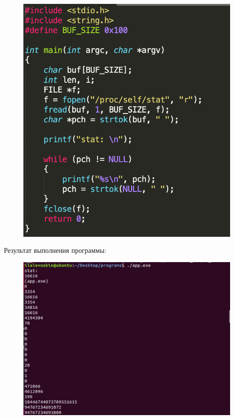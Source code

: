 \documentclass[a4paper,12pt]{article}
\begin{document}
	\begin{figure}[h!]
		\begin{center}
			{\includegraphics[scale = 0.7]{cond.png}}
			\label{ris:cond}
		\end{center}
	\end{figure}
	
	\newpage
	
	Результат выполнения программы:
	
	\begin{figure}[h!]
		\begin{center}
			{\includegraphics[scale = 0.7]{stat1.png}}
			\label{ris:stat1}
		\end{center}
	\end{figure}
\end{document}

